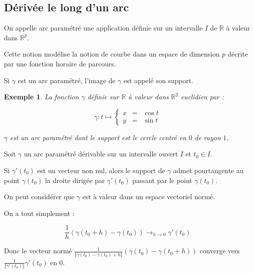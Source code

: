 \documentclass[a4paper,12pt]{book}
\newcommand{\Def}[2]{\begin{tcolorbox}[sharp corners, colback=white,colframe=blue!90!black!75, title=Définition : #1]#2\end{tcolorbox}}
\newcommand{\Prop}[2]{\begin{tcolorbox}[sharp corners, colback=white,colframe=red!90!black!75, title=Proposition : #1]#2\end{tcolorbox}}
\newcommand{\Pre}[1]{\begin{tcolorbox}[sharp corners, colback=white,colframe=green!60!green!30!black!75, title=Preuve]#1\end{tcolorbox}}
\newtheorem{Exe}{Exemple}[section]
\def\R{\mathbb{R}}
\begin{document}
\subsection{Dérivée le long d'un arc}
\Def{}{On appelle arc paramétré une application définie sur un intervalle $I$ de $\R$ à valeur dans $\R^p$.
\par Cette notion modélise la notion de courbe dans un espace de dimension $p$ décrite par une fonction horaire de parcours.
\par Si $\gamma$ est un arc paramétré, l'image de $\gamma$ est appelé son support.}
\begin{Exe}
La fonction $\gamma$ définie sur $\R$ à valeur dans $\R^2$ euclidien par :
\par $$\gamma:t\mapsto\left\{\begin{array}{rcl} x & = & \cos t\\ y & = & \sin t\end{array}\right.$$
\par $\gamma$ est un arc paramétré dont le support est le cercle centré en $0$ de rayon $1$.
\end{Exe}
\Prop{}{Soit $\gamma$ un arc paramétré dérivable sur un intervalle ouvert $I$ et $t_0\in I$.
\par Si $\gamma'(t_0)$ est un vecteur non nul, alors le support de $\gamma$ admet pourtangente au point $\gamma(t_0)$ la droite dirigée par $\gamma'(t_0)$ passant par le point $\gamma(t_0)$.}
\Pre{On peut considérer que $\gamma$ est à valeur dans un espace vectoriel normé.
\par On a tout simplement :
\par $$\frac{1}{h}(\gamma(t_0+h)-\gamma(t_0))\to_{h\to 0}\gamma'(t_0)$$
\par Donc le vecteur normé $\frac{1}{\Vert \gamma(t_0)-\gamma(t_0)+h\Vert}(\gamma(t_0)-\gamma(t_0+h))$ converge vers $\frac{1}{\Vert\gamma'(t_0)\Vert}\gamma'(t_0)$ en 0.}
\end{document}
